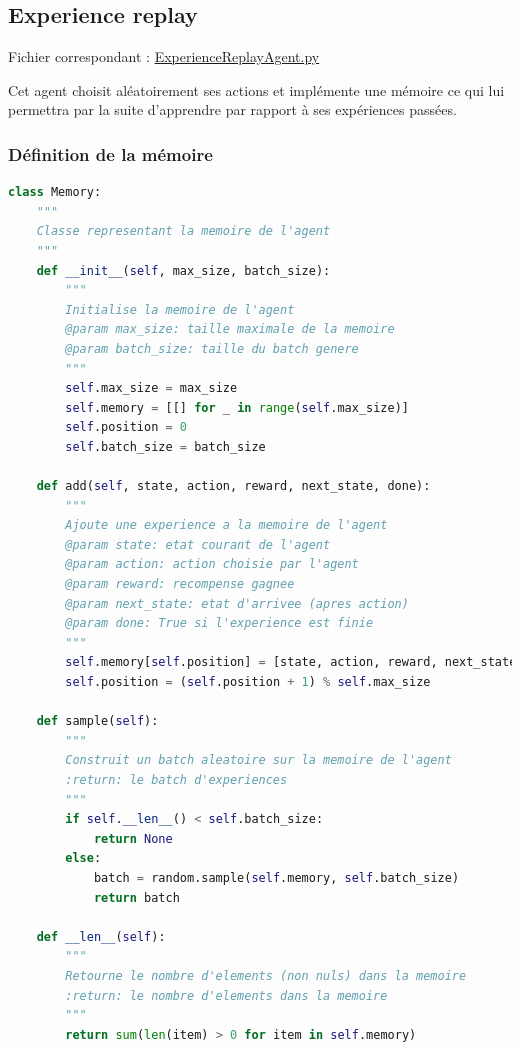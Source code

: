 \documentclass[10pt,a4paper]{article}
\begin{document}
\subsection{Experience replay}

Fichier correspondant : \href{https://github.com/NellyBarret/IA5-TP-APR/blob/master/ExperienceReplayAgent.py}{ExperienceReplayAgent.py}

Cet agent choisit aléatoirement ses actions et implémente une mémoire ce qui lui permettra par la suite d'apprendre par rapport à ses expériences passées.

\subsubsection{Définition de la mémoire}

\begin{lstlisting}[language=Python, caption=Implémentation de la mémoire d'un agent]
class Memory:
    """
    Classe representant la memoire de l'agent
    """
    def __init__(self, max_size, batch_size):
        """
        Initialise la memoire de l'agent
        @param max_size: taille maximale de la memoire
        @param batch_size: taille du batch genere
        """
        self.max_size = max_size
        self.memory = [[] for _ in range(self.max_size)]
        self.position = 0
        self.batch_size = batch_size

    def add(self, state, action, reward, next_state, done):
        """
        Ajoute une experience a la memoire de l'agent
        @param state: etat courant de l'agent
        @param action: action choisie par l'agent
        @param reward: recompense gagnee
        @param next_state: etat d'arrivee (apres action)
        @param done: True si l'experience est finie
        """
        self.memory[self.position] = [state, action, reward, next_state, done]
        self.position = (self.position + 1) % self.max_size

    def sample(self):
        """
        Construit un batch aleatoire sur la memoire de l'agent
        :return: le batch d'experiences
        """
        if self.__len__() < self.batch_size:
            return None
        else:
            batch = random.sample(self.memory, self.batch_size)
            return batch

    def __len__(self):
        """
        Retourne le nombre d'elements (non nuls) dans la memoire
        :return: le nombre d'elements dans la memoire
        """
        return sum(len(item) > 0 for item in self.memory)
\end{lstlisting}
\end{document}

